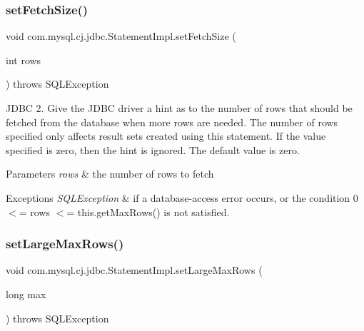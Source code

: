 \subsubsection{\texorpdfstring{set\+Fetch\+Size()}{setFetchSize()}}
{\footnotesize\ttfamily void com.\+mysql.\+cj.\+jdbc.\+Statement\+Impl.\+set\+Fetch\+Size (\begin{DoxyParamCaption}\item[{int}]{rows }\end{DoxyParamCaption}) throws S\+Q\+L\+Exception}

J\+D\+BC 2. Give the J\+D\+BC driver a hint as to the number of rows that should be fetched from the database when more rows are needed. The number of rows specified only affects result sets created using this statement. If the value specified is zero, then the hint is ignored. The default value is zero.


\begin{DoxyParams}{Parameters}
{\em rows} & the number of rows to fetch\\
\hline
\end{DoxyParams}

\begin{DoxyExceptions}{Exceptions}
{\em S\+Q\+L\+Exception} & if a database-\/access error occurs, or the condition 0 $<$= rows $<$= this.\+get\+Max\+Rows() is not satisfied. \\
\hline
\end{DoxyExceptions}
\mbox{\label{classcom_1_1mysql_1_1cj_1_1jdbc_1_1_statement_impl_adcb9676c5158982c94c3213a11feeb17}} 
\subsubsection{\texorpdfstring{set\+Large\+Max\+Rows()}{setLargeMaxRows()}}
{\footnotesize\ttfamily void com.\+mysql.\+cj.\+jdbc.\+Statement\+Impl.\+set\+Large\+Max\+Rows (\begin{DoxyParamCaption}\item[{long}]{max }\end{DoxyParamCaption}) throws S\+Q\+L\+Exception}

